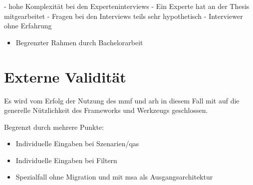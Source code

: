 - hohe Komplexität bei den Experteninterviews
- Ein Experte hat an der Thesis mitgearbeitet
- Fragen bei den Interviews teils sehr hypothetisch
- Interviewer ohne Erfahrung

\begin{itemize}
	\item Begrenzter Rahmen durch Bachelorarbeit
\end{itemize}

\section{Externe Validität}

Es wird vom Erfolg der Nutzung des \gls{mmf} und \gls{arh} in diesem Fall mit \jf auf die generelle Nützlichkeit des Frameworks und Werkzeugs geschlossen.

Begrenzt durch mehrere Punkte:

\begin{itemize}
	\item Individuelle Eingaben bei Szenarien/\glspl{qa}
	\item Individuelle Eingaben bei Filtern
	\item Spezialfall ohne Migration und mit \gls{msa} als Ausgangsarchitektur
\end{itemize}